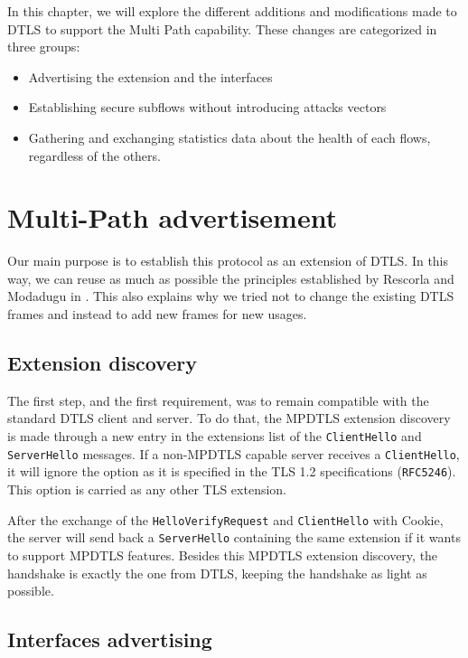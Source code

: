 \documentclass[11pt,a4paper,oldfontcommands]{memoir}
\begin{document}
In this chapter, we will explore the different additions and modifications made to DTLS to support the Multi Path capability. These changes are categorized in three groups:
\begin{itemize}
\item Advertising the extension and the interfaces
\item Establishing secure subflows without introducing attacks vectors
\item Gathering and exchanging statistics data about the health of each flows, regardless of the others. 
\end{itemize}


\section{Multi-Path advertisement}

Our main purpose is to establish this protocol as an extension of DTLS. In this way, we can reuse as much as possible the principles established by Rescorla and Modadugu in \cite{modadugu2004design}. This also explains why we tried not to change the existing DTLS frames and instead to add new frames for new usages.

\subsection{Extension discovery}

The first step, and the first requirement, was to remain compatible with the standard DTLS client and server. To do that, the MPDTLS extension discovery is made through a new entry in the extensions list of the \verb!ClientHello! and \verb!ServerHello! messages. If a non-MPDTLS capable server receives a \verb!ClientHello!, it will ignore the option  as it is specified in the TLS 1.2 specifications (\verb!RFC5246!). This option is carried as any other TLS extension.



After the exchange of the \verb!HelloVerifyRequest! and \verb!ClientHello! with Cookie, the server will send back a \verb!ServerHello! containing the same extension if it wants to support MPDTLS features. Besides this MPDTLS extension discovery, the handshake is exactly the one from DTLS, keeping the handshake as light as possible.

\subsection{Interfaces advertising}
\end{document}
